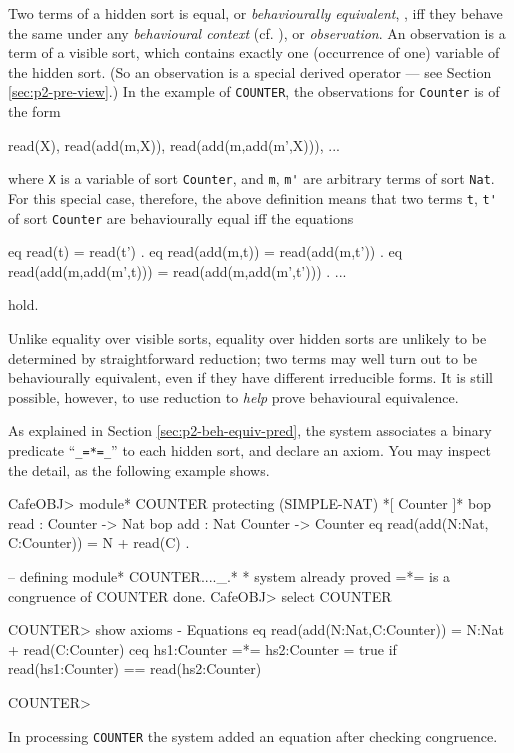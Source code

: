 \documentclass[a4paper]{memoir}
\begin{document}
Two terms of a hidden sort is equal, or {\em behaviourally equivalent},
, iff they behave the same under
any {\em behavioural context} (cf. \cite{hsa}),
 or {\em observation}.
An observation is a term of a visible sort, which contains
exactly one (occurrence of one) variable of the hidden sort.
(So an observation is a special derived operator --- see
Section \ref{sec:p2-pre-view}.)
In the example of \verb|COUNTER|, the observations for \verb|Counter|
is of the form
\begin{vvtm}
\begin{ccode}
  read(X), read(add(m,X)), read(add(m,add(m',X))), ...
\end{ccode}
\end{vvtm}
where \verb|X| is a variable of sort \verb|Counter|, and
\verb|m|, \verb|m'| are arbitrary terms of sort \verb|Nat|.
For this special case, therefore, the above definition means that
two terms \verb|t|, \verb|t'| of sort \verb|Counter| are
behaviourally equal iff the equations
\begin{vvtm}
\begin{ccode}
  eq read(t) = read(t') .
  eq read(add(m,t)) = read(add(m,t')) .
  eq read(add(m,add(m',t))) = read(add(m,add(m',t'))) .
  ...
\end{ccode}
\end{vvtm}
hold.

Unlike equality over visible sorts, equality over hidden sorts
are unlikely to be determined by straightforward reduction; two terms
may well turn out to be behaviourally equivalent, even if they have
different irreducible forms. It is still possible, however, to
use reduction to {\em help} prove behavioural equivalence.

As explained in Section \ref{sec:p2-beh-equiv-pred}, the system
associates a binary predicate ``\verb|_=*=_|'' to each hidden sort,
and declare an axiom. You may inspect the detail,
as the following example shows.
\begin{vvtm}
\begin{ccode}
  CafeOBJ> module* COUNTER {
      protecting (SIMPLE-NAT)
      *[ Counter ]*
      bop read : Counter -> Nat
      bop add : Nat Counter -> Counter
      eq read(add(N:Nat, C:Counter)) = N + read(C) .
    }

  -- defining module* COUNTER...._.*
  * system already proved =*= is a congruence of COUNTER done.
  CafeOBJ> select COUNTER

  COUNTER> show axioms
  - Equations
    eq read(add(N:Nat,C:Counter)) = N:Nat + read(C:Counter)
    ceq hs1:Counter =*= hs2:Counter = true if read(hs1:Counter) ==
        read(hs2:Counter)

  COUNTER> 
\end{ccode}
\end{vvtm}
In processing \verb|COUNTER| the system added an equation
after checking congruence.
\end{document}
